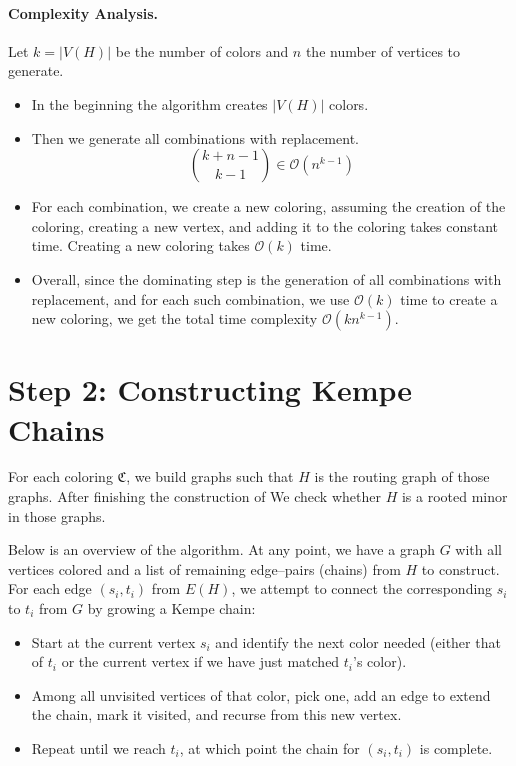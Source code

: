 \paragraph{Complexity Analysis.}
Let \( k = |V(H)| \) be the number of colors and \( n \) the number of vertices to generate.

\begin{itemize}
    \item In the beginning the algorithm creates $|V(H)|$ colors.
    
    \item Then we generate all combinations with replacement.
    \[
        \binom{k + n - 1}{k - 1} \in \mathcal{O}(n^{k-1})
    \]
    \item 
 For each combination, we create a new coloring, assuming the creation of the coloring,  
 creating a new vertex, and adding it to the coloring takes constant time. Creating a new coloring
 takes $\mathcal{O}(k)$ time.
    
    \item Overall, since the dominating step is the generation of all combinations with replacement, and for each such combination, 
 we use $\mathcal{O}(k)$ time to create a new coloring, we get the total time complexity \( \mathcal{O}(kn^{k-1}) \).
\end{itemize}


\section{Step 2: Constructing Kempe Chains}

For each coloring $\mathfrak{C}$, we build graphs such that $H$ is the routing graph of those graphs. After finishing the construction of 
We check whether $H$ is a rooted minor in those graphs.

Below is an overview of the algorithm. At any point, we have a graph $G$ with all vertices colored and a list of remaining edge–pairs (chains) from $H$ to construct. For each edge $(s_i,t_i)$ from $E(H)$, we attempt to connect the corresponding $s_i$ to $t_i$ from $G$ by growing a Kempe chain:

\begin{itemize}
    \item Start at the current vertex $s_i$ and identify the next color needed (either that of $t_i$ or the current vertex if we have just matched $ t_i$'s color).
    \item Among all unvisited vertices of that color, pick one, add an edge to extend the chain, mark it visited, and recurse from this new vertex.
    \item Repeat until we reach $t_i$, at which point the chain for $(s_i,t_i)$ is complete.
\end{itemize}

